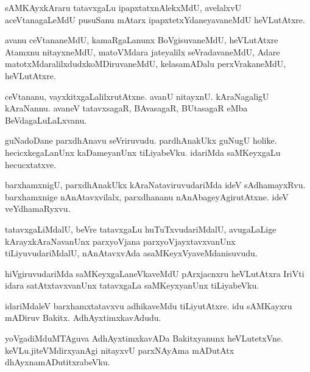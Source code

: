 \documentclass{article}
\begin{document}
\begin{mn}%
sAMKAyxkAraru tatavxgaLu ipapxtatxnAlekxMdU, avelalxvU aceVtanagaLeMdU pusuSanu mAtarx 
ipapxtetxYdaneyavaneMdU heVLutAtxre.
\end{mn}

\begin{mn}%
avanu ceVtananeMdU, kamaRgaLanunx BoVgisuvaneMdU, heVLutAtxre Atamxnu nitayxneMdU, 
matoVMdara jateyalilx seVradavaneMdU, Adare matotxMdaralilxdudxkoMDiruvaneMdU, 
kelasamADalu perxVrakaneMdU, heVLutAtxre.
\end{mn}

\begin{mn}%
ceVtananu, vayxkitxgaLalilxrutAtxne. avanU nitayxnU. kAraNagaligU kAraNannu. avaneV 
tatavxsagaR, BAvasagaR, BUtasagaR eMba BeVdagaLuLaLxvanu.
\end{mn}

\begin{mn}%
guNadoDane parxdhAnavu seVriruvudu. pardhAnakUkx guNugU holike. hecicxkegaLanUnx 
kaDameyanUnx tiLiyabeVku. idariMda saMKeyxgaLu hecucxtatxve.
\end{mn}

\begin{mn}%
barxhamxnigU, parxdhAnakUkx kAraNataviruvudariMda ideV sAdhamayxRvu. barxhamxnige 
nAnAtavxvilalx, parxdhananu nAnAbageyAgirutAtxne. ideV veYdhamaRyxvu.
\end{mn}

\begin{mn}%
tatavxgaLiMdalU, beVre tatavxgaLu huTuTxvudariMdalU, avugaLaLige kArayxkAraNavanUnx 
parxyoVjana parxyoVjayxtavxvanUnx tiLiyuvudariMdalU, nAnAtavxvAda asaMKeyxVyaveMdanisuvudu.
\end{mn}

\begin{mn}%
hiVgiruvudariMda saMKeyxgaLaneVkaveMdU pArxjacnxru heVLutAtxra IriVti  idara 
satAtxtavxvanUnx tatavxgaLa saMKeyxyanUnx tiLiyabeVku.
\end{mn}

\begin{mn}%
idariMdaleV barxhamxtatavxvu adhikaveMdu tiLiyutAtxre. idu sAMKayxru mADiruv Bakitx. 
AdhAyxtimxkavAdudu.
\end{mn}

\begin{mn}%
yoVgadiMduMTAguva AdhAyxtimxkavADa Bakitxyanunx heVLutetxVne. keVLu.jiteVMdirxyanAgi 
nitayxvU parxNAyAma mADutAtx dhAyxnamADutitxrabeVku.
\end{mn}
\end{document}
